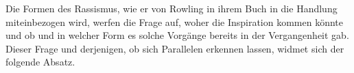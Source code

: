 Die Formen des Rassismus, wie er von Rowling in ihrem Buch in die Handlung miteinbezogen wird, werfen die Frage auf, woher die Inspiration kommen könnte und ob und in welcher Form es solche Vorgänge bereits in der Vergangenheit gab. Dieser Frage und derjenigen, ob sich Parallelen erkennen lassen, widmet sich der folgende Absatz.






